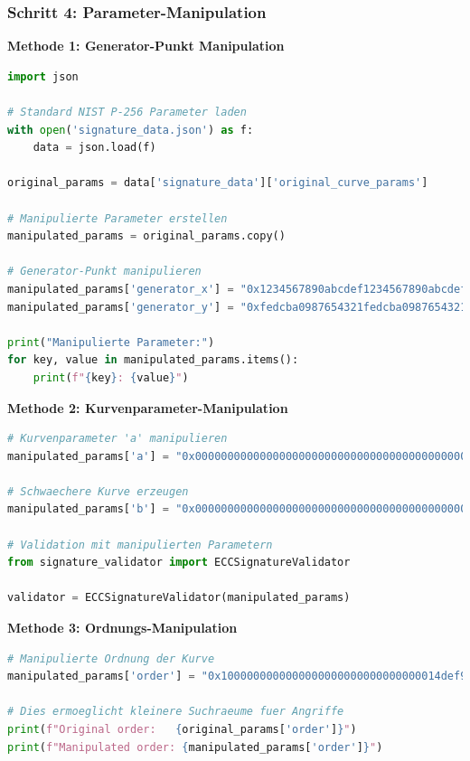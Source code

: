 \documentclass{article}
\begin{document}
\subsubsection{Schritt 4: Parameter-Manipulation}

\textbf{Methode 1: Generator-Punkt Manipulation}

\begin{lstlisting}[language=python, caption=Generator-Manipulation]
import json

# Standard NIST P-256 Parameter laden
with open('signature_data.json') as f:
    data = json.load(f)

original_params = data['signature_data']['original_curve_params']

# Manipulierte Parameter erstellen
manipulated_params = original_params.copy()

# Generator-Punkt manipulieren
manipulated_params['generator_x'] = "0x1234567890abcdef1234567890abcdef1234567890abcdef1234567890abcdef"
manipulated_params['generator_y'] = "0xfedcba0987654321fedcba0987654321fedcba0987654321fedcba0987654321"

print("Manipulierte Parameter:")
for key, value in manipulated_params.items():
    print(f"{key}: {value}")
\end{lstlisting}

\textbf{Methode 2: Kurvenparameter-Manipulation}

\begin{lstlisting}[language=python, caption=Kurvenkoeffizienten ändern]
# Kurvenparameter 'a' manipulieren 
manipulated_params['a'] = "0x0000000000000000000000000000000000000000000000000000000000000003"

# Schwaechere Kurve erzeugen
manipulated_params['b'] = "0x0000000000000000000000000000000000000000000000000000000000000007"

# Validation mit manipulierten Parametern
from signature_validator import ECCSignatureValidator

validator = ECCSignatureValidator(manipulated_params)
\end{lstlisting}

\textbf{Methode 3: Ordnungs-Manipulation}

\begin{lstlisting}[language=python, caption=Gruppenordnung manipulieren]
# Manipulierte Ordnung der Kurve
manipulated_params['order'] = "0x1000000000000000000000000000000014def9dea2f79cd65812631a5cf5d3ed"

# Dies ermoeglicht kleinere Suchraeume fuer Angriffe
print(f"Original order:   {original_params['order']}")
print(f"Manipulated order: {manipulated_params['order']}")
\end{lstlisting}
\end{document}
